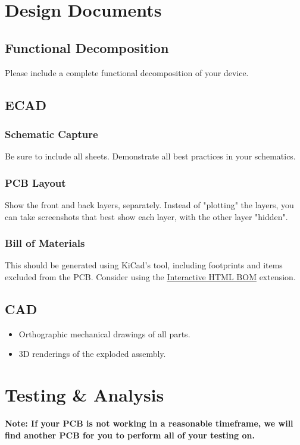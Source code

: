 \documentclass[10pt]{article}
\begin{document}
\section{Design Documents}

\subsection{Functional Decomposition}
Please include a complete functional decomposition of your device.
\subsection{ECAD}
\subsubsection{Schematic Capture}
Be sure to include all sheets.  Demonstrate all best practices in your
schematics.

\subsubsection{PCB Layout}
Show the front and back layers, separately.  Instead of "plotting" the layers,
you can take screenshots that best show each layer, with the other layer
"hidden".

\subsubsection{Bill of Materials}
This should be generated using KiCad's tool, including footprints and items
excluded from the PCB.  Consider using the
\href{https://github.com/openscopeproject/InteractiveHtmlBom}{Interactive HTML
BOM} extension.

\subsection{CAD}
\begin{itemize}
    \item Orthographic mechanical drawings of all parts.
    \item 3D renderings of the exploded assembly.
\end{itemize}

\section{Testing \& Analysis}

\textbf{Note: If your PCB is not working in a reasonable timeframe, we will find
another PCB for you to perform all of your testing on.}
\end{document}
